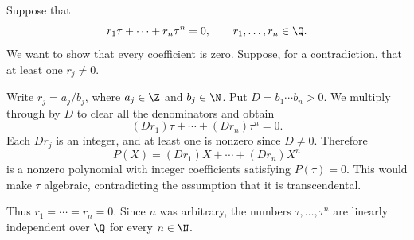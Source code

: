 Suppose that
\[
  r_1\tau+\cdots+r_n\tau^n=0,
  \qquad r_1,\ldots,r_n\in\Q.
\]
We want to show that every coefficient is zero. Suppose, for a
contradiction, that at least one $r_j\ne0$.

Write $r_j=a_j/b_j$, where $a_j\in\Z$ and $b_j\in\N$.
Put $D=b_1\cdots b_n>0$. We multiply through by $D$ to clear
all the denominators and obtain
\[
  (Dr_1)\tau+\cdots+(Dr_n)\tau^n=0.
\]
Each $Dr_j$ is an integer, and at least one is nonzero since
$D\ne0$. Therefore
\[
  P(X)=(Dr_1)X+\cdots+(Dr_n)X^n
\]
is a nonzero polynomial with integer coefficients satisfying
$P(\tau)=0$. This would make $\tau$ algebraic, contradicting
the assumption that it is transcendental.

Thus $r_1=\cdots=r_n=0$. Since $n$ was arbitrary, the numbers
$\tau,\ldots,\tau^n$ are linearly independent over $\Q$ for every
$n\in\N$.
